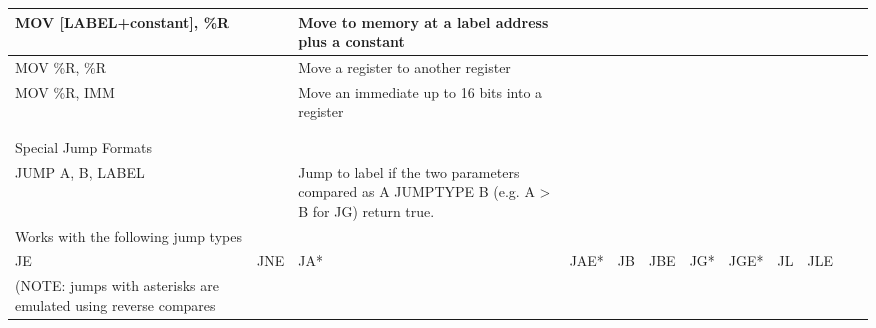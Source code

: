 \documentclass[a4paper]{article}
\begin{document}
\begin{tabular}{|l|l|l|l|l|l|l|l|l|l|l|l|}
\hline
MOV [LABEL+constant], \%R&&Move to memory at a label address plus a constant&&&&&&&
&&\\
\hline
MOV \%R, \%R&&Move a register to another register&&&&&&&
&&\\
\hline
MOV \%R, IMM&&Move an immediate up to 16 bits into a register&&&&&&&
&&\\
\hline
&&&&&&&&&
&&\\
\hline
&&&&&&&&&
&&\\
\hline
Special Jump Formats&&&&&&&&&
&&\\
\hline
JUMP A, B, LABEL&&Jump to label if the two parameters compared as A JUMPTYPE B (e.g. A > B for JG) return true.&&&&&&&
&&\\
\hline
Works with the following jump types&&&&&&&&&
&&\\
\hline
JE& JNE& JA*& JAE*& JB& JBE& JG*& JGE*& JL& JLE 
&&\\
\hline
(NOTE: jumps with asterisks are emulated using reverse compares&&&&&&&&&\end{tabular}
\end{document}
